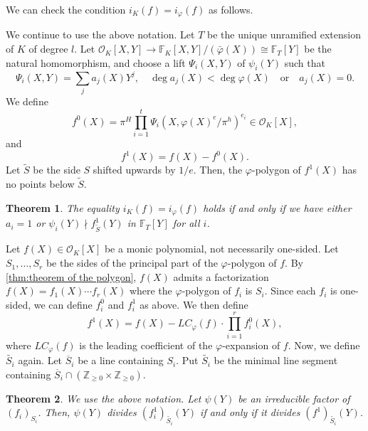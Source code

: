 \documentclass{article}
\newcommand{\field}[1]{\mathbb{#1}}
\newcommand{\Z}{\field{Z}}
\newcommand{\F}{\field{F}}
\newtheorem{theorem}{Theorem}[section]
\theoremstyle{definition}
\theoremstyle{remark}
\numberwithin{equation}{section}
\begin{document}
    We can check the condition $i_K(f) = i_{\varphi}(f)$ as follows.

    We continue to use the above notation. 
    Let $T$ be the unique unramified extension of $K$ of degree $l$. 
    Let $\mathcal{O}_K[X,Y] \to \field{F}_K[X,Y]/(\bar{\varphi}(X)) \cong \field{F}_T[Y]$ be the natural homomorphism, 
    and choose a lift $\Psi_i(X,Y)$ of $\psi_i(Y)$ such that 
    \[
      \Psi_i(X,Y) = \sum_j a_j(X)Y^j,\quad \deg a_j(X) < \deg\varphi(X) \quad \text{or} \quad a_j(X) = 0. 
    \]
    We define 
    \[
      f^0(X) = \pi^H \prod_{i = 1}^t \Psi_i(X,\varphi(X)^e/\pi^h)^{e_i} \in \mathcal{O}_K[X], 
    \]
    and 
    \[
      f^1(X) = f(X) - f^0(X). 
    \]
    Let $\tilde{S}$ be the side $S$ shifted upwards by $1/e$. 
    Then, the $\varphi$-polygon of $f^1(X)$ has no points below $\tilde{S}$. 

    \begin{theorem}\label{thm:equivalent condition of Montes Nart}\cite[Criterion 1]{MR1152908}
      The equality $i_K(f) = i_{\varphi}(f)$ holds if and only if we have either 
      $a_i = 1$ or $\psi_i(Y) \nmid f^1_{\tilde{S}}(Y)$ in $\F_T[Y]$ for all $i$. 
    \end{theorem}

    Let $f(X) \in \mathcal{O}_K[X]$ be a monic polynomial, not necessarily one-sided.
    Let $S_1, \dots ,S_r$ be the sides of the principal part of the $\varphi$-polygon of $f$. 
    By \cref{thm:theorem of the polygon}, $f(X)$ admits a factorization 
    $f(X)=f_1(X) \cdots f_r(X)$ where the $\varphi$-polygon of $f_i$ is $S_{i}$. 
    Since each $f_i$ is one-sided, we can define $f_i^0$ and $f_i^1$ as above. 
    We then define 
    \[
      f^1(X)=f(X)-LC_{\varphi}(f) \cdot \prod_{i=1}^r f_i^0(X), 
    \]
    where $LC_{\varphi}(f)$ is the leading coefficient of the $\varphi$-expansion of $f$. 
    Now, we define $\widetilde{S_{i}}$ again.
    Let $\overline{S}_{i}$ be a line containing $S_{i}$.
    Put $\widetilde{S_{i}}$ be the minimal line segment containing $\overline{S}_{i} \cap (\Z_{\ge 0} \times \Z_{\ge 0})$. 

    \begin{theorem}\label{thm:criterion 2 of Montes Nart}\cite[Criterion 2]{MR1152908}
      We use the above notation. Let $\psi(Y)$ be an irreducible factor of $(f_i)_{S_{i}}$. 
      Then, $\psi(Y)$ divides $(f_i^1)_{\widetilde{S_{i}}}(Y)$ if and only if it divides $(f^1)_{\widetilde{S_{i}}}(Y)$. 
    \end{theorem}
\end{document}
